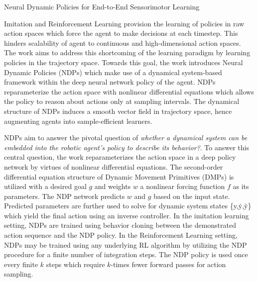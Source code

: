 \documentclass[11pt,letterpaper]{article}
\begin{document}
\begin{center}
  \large{Neural Dynamic Policies for End-to-End Sensorimotor Learning}
\end{center}

Imitation and Reinforcement Learning provision the learning of policies in raw action spaces which force the agent to make decisions at each timestep. This hinders scalability of agent to continuous and high-dimensional action spaces. The work aims to address this  shortcoming of the learning paradigm by learning policies in the trajectory space. Towards this goal, the work introduces Neural Dynamic Policies (NDPs) which make use of a dynamical system-based framework within the deep neural network policy of the agent. NDPs reparameterize the action space with nonlinear differential equations which allows the policy to reason about actions only at sampling intervals. The dynamical structure of NDPs induces a smooth vector field in trajectory space, hence augmenting agents into sample-efficient learners. 

NDPs aim to answer the pivotal question of \textit{whether a dynamical system can be embedded into the robotic agent's policy to describe its behavior?}. To answer this central question, the work reparameterizes the action space in a deep policy network by virtues of nonlinear differential equations. The second-order differential equation structure of Dynamic Movement Primitives (DMPs) is utilized with a desired goal $g$ and weights $w$ a nonlinear forcing function $f$ as its parameters. The NDP network predicts $w$ and $g$ based on the input state. Predicted parameters are further used to solve for dynamic system states \{y,\.{y},\"{y}\} which yield the final action using an inverse controller. In the imitation learning setting, NDPs are trained using behavior cloning between the demonstrated action sequence and the NDP policy. In the Reinforcement Learning setting, NDPs may be trained using any underlying RL algorithm by utilizing the NDP procedure for a finite number of integration steps. The NDP policy is used once every finite $k$ steps which require $k$-times fewer forward passes for action sampling. 
\end{document}
